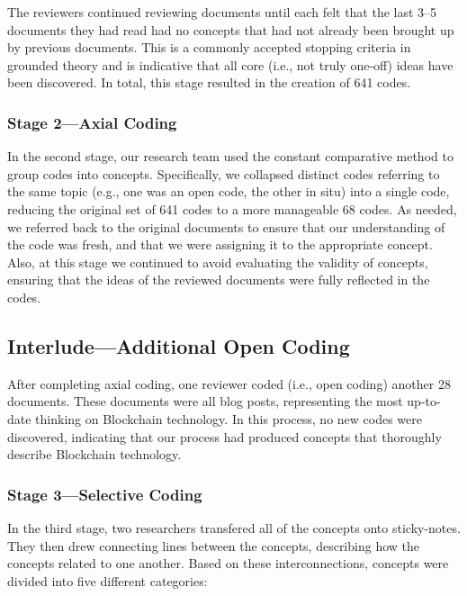 The reviewers continued reviewing documents until each felt that the last 3--5 documents they had read had no concepts that had not already been brought up by previous documents.
This is a commonly accepted stopping criteria in grounded theory and is indicative that all core (i.e., not truly one-off) ideas have been discovered.
In total, this stage resulted in the creation of 641 codes.

\subsubsection{Stage 2---Axial Coding}
In the second stage, our research team used the constant comparative method to group codes into concepts.
Specifically, we collapsed distinct codes referring to the same topic (e.g., one was an open code, the other in situ) into a single code, reducing the original set of 641 codes to a more manageable 68 codes.
As needed, we referred back to the original documents to ensure that our understanding of the code was fresh, and that we were assigning it to the appropriate concept.
Also, at this stage we continued to avoid evaluating the validity of concepts, ensuring that the ideas of the reviewed documents were fully reflected in the codes.

\subsection{Interlude---Additional Open Coding}
After completing axial coding, one reviewer coded (i.e., open coding) another 28 documents.
These documents were all blog posts, representing the most up-to-date thinking on Blockchain technology.
In this process, no new codes were discovered, indicating that our process had produced concepts that thoroughly describe Blockchain technology.

\subsubsection{Stage 3---Selective Coding}
In the third stage, two researchers transfered all of the concepts onto sticky-notes.
They then drew connecting lines between the concepts, describing how the concepts related to one another.
Based on these interconnections, concepts were divided into five different categories:

